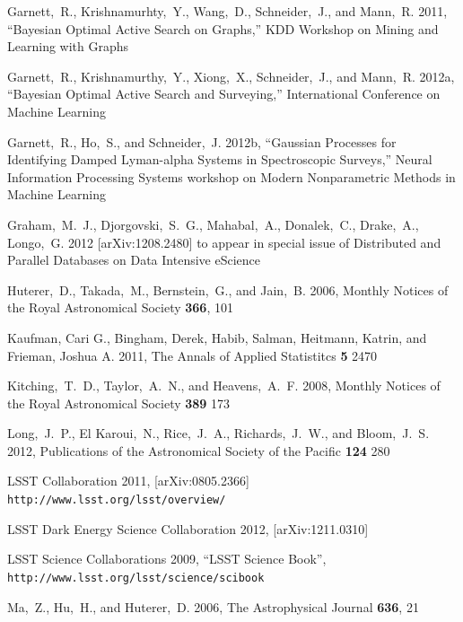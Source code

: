 \documentclass[useAMS,usenatbib,tightenlines,11pt,preprint]{aastex}
\begin{document}
\begin{thebibliography}{99}
Garnett,~R., Krishnamurhty,~Y., Wang,~D., Schneider,~J., and Mann,~R. 2011,
``Bayesian Optimal Active Search on Graphs,'' KDD Workshop on Mining and
Learning with Graphs

Garnett,~R., Krishnamurthy,~Y., Xiong,~X., Schneider,~J., and Mann,~R. 2012a,
``Bayesian Optimal Active Search and Surveying,'' International Conference on
Machine Learning

Garnett,~R., Ho,~S., and Schneider,~J. 2012b,
``Gaussian Processes for Identifying Damped Lyman-alpha Systems in Spectroscopic
Surveys,'' Neural Information Processing Systems 
workshop on Modern Nonparametric Methods in Machine Learning

Graham,~M.~J., Djorgovski,~S.~G., Mahabal,~A., Donalek,~C., Drake,~A.,
Longo,~G. 2012 [arXiv:1208.2480] to appear in special issue of Distributed and
Parallel Databases on Data Intensive eScience

Huterer,~D., Takada,~M., Bernstein,~G., and Jain,~B. 2006,
Monthly Notices of the Royal Astronomical Society {\bf 366}, 101

Kaufman, Cari G., Bingham, Derek, Habib, Salman, Heitmann, Katrin, and Frieman,
Joshua A. 2011, The Annals of Applied Statistitcs {\bf 5} 2470

Kitching,~T.~D., Taylor,~A.~N., and Heavens,~A.~F. 2008,
Monthly Notices of the Royal Astronomical Society {\bf 389} 173

Long,~J.~P., El Karoui,~N., Rice,~J.~A., Richards,~J.~W., and Bloom,~J.~S. 2012,
Publications of the Astronomical Society of the Pacific {\bf 124} 280

LSST Collaboration 2011, [arXiv:0805.2366]
\verb|http://www.lsst.org/lsst/overview/|

LSST Dark Energy Science Collaboration 2012, [arXiv:1211.0310]

LSST Science Collaborations 2009, ``LSST Science Book'',
\verb|http://www.lsst.org/lsst/science/scibook|

Ma,~Z., Hu,~H., and Huterer,~D. 2006, The Astrophysical Journal {\bf 636}, 21


\end{thebibliography}
\end{document}
